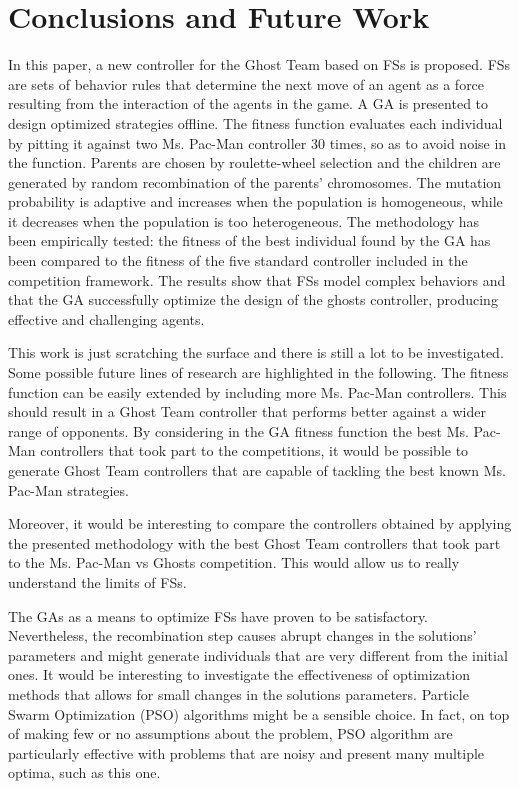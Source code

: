 \documentclass{llncs}
\begin{document}
%
%

\section{Conclusions and Future Work}
\label{sec:conclusions}

In this paper, a new controller for the Ghost Team based on FSs is proposed. FSs are sets of behavior rules that determine the next move of an agent as a force resulting from the interaction of the agents in the game. A GA is presented to design optimized strategies offline. The fitness function evaluates each individual by pitting it against two Ms. Pac-Man controller 30 times, so as to avoid noise in the function. Parents are chosen by roulette-wheel selection and the children are generated by random recombination of the parents' chromosomes. The mutation probability is adaptive and increases when the population is homogeneous, while it decreases when the population is too heterogeneous. The methodology has been empirically tested: the fitness of the best individual found by the GA has been compared to the fitness of the five standard controller included in the competition framework. The results show that FSs model complex behaviors and that the GA successfully optimize the design of the ghosts controller, producing effective and challenging agents.

This work is just scratching the surface and there is still a lot to be investigated. Some possible future lines of research are highlighted in the following. The fitness function can be easily extended by including more Ms. Pac-Man controllers. This should result in a Ghost Team controller that performs better against a wider range of opponents. By considering in the GA fitness function the best Ms. Pac-Man controllers that took part to the competitions, it would be possible to generate Ghost Team controllers that are capable of tackling the best known Ms. Pac-Man strategies. 

Moreover, it would be interesting to compare the controllers obtained by applying the presented methodology with the best Ghost Team controllers that took part to the Ms. Pac-Man vs Ghosts competition. This would allow us to really understand the limits of FSs.

The GAs as a means to optimize FSs have proven to be satisfactory. Nevertheless, the recombination step causes abrupt changes in the solutions' parameters and might generate individuals that are very different from the initial ones. It would be interesting to investigate the effectiveness of optimization methods that allows for small changes in the solutions parameters. Particle Swarm Optimization (PSO) algorithms  might be a sensible choice. In fact, on top of making few or no assumptions about the problem, PSO algorithm are particularly effective with problems that are noisy and present many multiple optima, such as this one.
\end{document}

